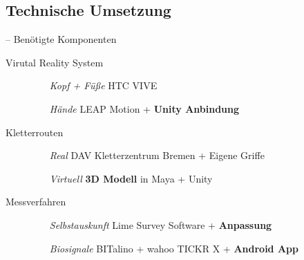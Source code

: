 \subsection{Technische Umsetzung}

\begin{frame}{\currentname{} -- Benötigte Komponenten}

\begin{description}
	\item[Virutal Reality System]\mbox{}
	\begin{itemize}
		\item[\textit{Kopf + Füße}] HTC VIVE
		\item[\textit{Hände}] LEAP Motion + \textbf{Unity Anbindung}
	\end{itemize}
	\item[Kletterrouten]\mbox{}
	\begin{itemize}
		\item[\textit{Real}] DAV Kletterzentrum Bremen + Eigene Griffe
		\item[\textit{Virtuell}] \textbf{3D Modell} in Maya + Unity
	\end{itemize}
	\item[Messverfahren]\mbox{}
	\begin{itemize}
		\item[\textit{Selbstauskunft}] Lime Survey Software + \textbf{Anpassung}
		\item[\textit{Biosignale}] BITalino +  wahoo TICKR X + \textbf{Android App}
	\end{itemize}
\end{description}

\end{frame}

